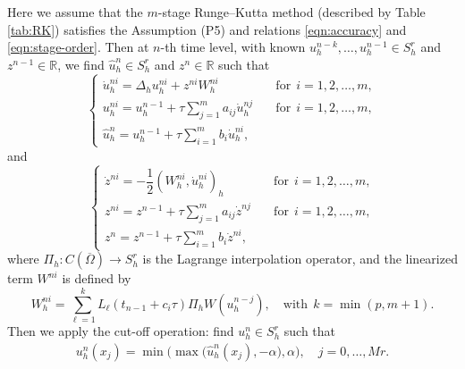 \documentclass[10pt,final,leqno,onefignum,onetabnum]{siamltex}%
\begin{document}
Here we assume that the  $m$-stage Runge--Kutta method (described by Table \ref{tab:RK}) satisfies
the Assumption (P5) and relations \eqref{eqn:accuracy} and \eqref{eqn:stage-order}. Then at $n$-th time level,
with known $u_h^{n-k}, \ldots, u_h^{n-1} \in S_h^r$ and $z^{n-1}\in \mathbb{R}$,
we find $\hat u_h^n \in S_h^r$ and $z^n\in \mathbb{R}$ such that
\begin{equation}\label{eqn:AC-sav-fully}
    \begin{cases}
    \dot u_h^{ni} = \Delta_h u_h^{ni} +  z^{ni} W_h^{ni}&\quad \text{for} ~~i=1,2,\dots,m, \\ %
    u_h^{ni} = u_h^{n-1} + \tau \sum_{j=1}^m a_{ij} \dot u_h^{nj} &\quad \text{for} ~~i=1,2,\dots,m, \\
    \hat u_h^{n} = u_h^{n-1} + \tau \sum_{i=1}^m b_i \dot u_h^{ni},
  \end{cases}
\end{equation}
and
\begin{equation}\label{eqn:r-fully}
\begin{cases}
    \dot z^{ni} = - \dfrac12(W_h^{ni},   \dot u_h^{ni})_h &\quad \text{for} ~~i=1,2,\dots,m, \\
    z^{ni} = z^{n-1} + \tau \sum_{j=1}^m a_{ij}  \dot z^{nj}&\quad \text{for} ~~i=1,2,\dots,m, \\
   z^{n} = z^{n-1} +  \tau \sum_{i=1}^m b_i  \dot z^{ni},
 \end{cases}
\end{equation}
where $\Pi_h:C(\overline\Omega)\rightarrow S_h^r$ is the Lagrange interpolation operator, and the linearized term $W^{ni}$ is  defined by
$$ W_h^{ni} =  \sum_{\ell=1}^k L_{\ell}(t_{n-1}+c_i\tau)\Pi_h W(u_h^{n-j}),\quad \text{with} ~~k=\min(p,m+1). $$
Then we apply the cut-off operation: find $u_h^n \in S_h^r$ such that
\begin{equation}\label{eqn:truncation-fully-sav}
\begin{split}
u_h^n(x_j)  = \min\big(\max \big(\hat u_h^n(x_j), - \alpha \big) , \alpha \big),  \quad j=0,\dots,Mr.
\end{split}
\end{equation}
\end{document}
